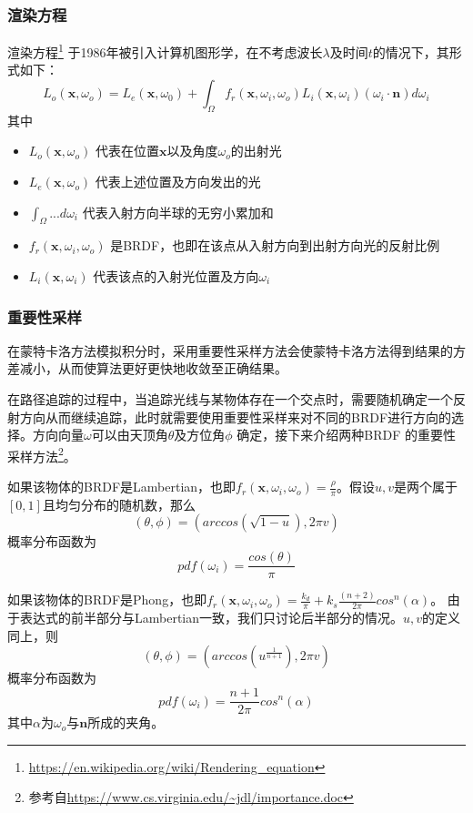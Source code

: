 \subsubsection {渲染方程}
渲染方程\footnote{\url{https://en.wikipedia.org/wiki/Rendering_equation}} 于1986年被引入计算机图形学，在不考虑波长$\lambda$及时间$t$的情况下，其形式如下：
\[
    L_{o}(\bm{x}, \omega_{o})=L_{e}(\bm{x}, \omega_{0})+\int_{\Omega}f_{r}(\bm{x}, \omega_{i}, \omega_{o})L_{i}(\bm{x}, \omega_{i})(\omega_{i}\cdot\bm{n})d\omega_{i}
\]
其中
\begin{itemize}[noitemsep]
    \item $L_{o}(\bm{x}, \omega_{o})$ 代表在位置$\bm{x}$以及角度$\omega_{o}$的出射光
    \item $L_{e}(\bm{x}, \omega_{o})$ 代表上述位置及方向发出的光
    \item $\int_{\Omega} ...d\omega_{i}$ 代表入射方向半球的无穷小累加和
    \item $f_{r}(\bm{x}, \omega_{i}, \omega_{o})$ 是BRDF，也即在该点从入射方向到出射方向光的反射比例
    \item $L_{i}(\bm{x}, \omega_{i})$ 代表该点的入射光位置及方向$\omega_{i}$
\end{itemize}

\subsubsection {重要性采样}
在蒙特卡洛方法模拟积分时，采用重要性采样方法会使蒙特卡洛方法得到结果的方差减小，从而使算法更好更快地收敛至正确结果。

在路径追踪的过程中，当追踪光线与某物体存在一个交点时，需要随机确定一个反射方向从而继续追踪，此时就需要使用重要性采样来对不同的BRDF进行方向的选择。方向向量$\omega$可以由天顶角$\theta$及方位角$\phi$ 确定，接下来介绍两种BRDF 的重要性采样方法\footnote{参考自\url{https://www.cs.virginia.edu/~jdl/importance.doc}}。

如果该物体的BRDF是Lambertian，也即$f_{r}(\bm{x}, \omega_{i}, \omega_{o})=\frac{\rho}{\pi}$。假设$u,v$是两个属于$[0,1]$且均匀分布的随机数，那么
\[
    (\theta, \phi)=(arccos(\sqrt{1-u}), 2\pi v)
\]
概率分布函数为
\[
    pdf(\omega_{i})=\frac{cos(\theta)}{\pi}
\]

如果该物体的BRDF是Phong，也即$f_{r}(\bm{x}, \omega_{i}, \omega_{o})=\frac{k_{d}}{\pi}+k_{s}\frac{(n+2)}{2\pi}cos^{n}(\alpha)$。 由于表达式的前半部分与Lambertian一致，我们只讨论后半部分的情况。$u,v$的定义同上，则
\[
    (\theta, \phi)=(arccos(u^{\frac{1}{n+1}}), 2\pi v)
\]
概率分布函数为
\[
    pdf(\omega_{i})=\frac{n+1}{2\pi}cos^{n}(\alpha)
\]
其中$\alpha$为$\omega_{o}$与$\bm{n}$所成的夹角。


